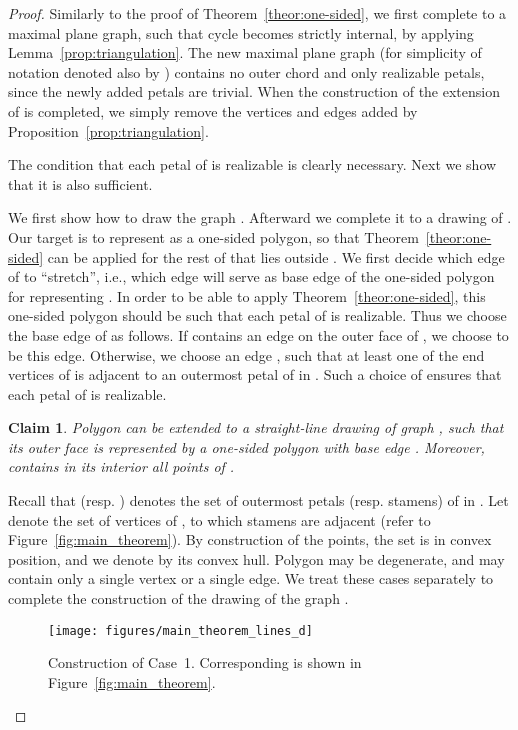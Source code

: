 \documentclass{llncs}
\newtheorem{stat}{Claim}
\begin{document}
\begin{proof}
Similarly to the proof of Theorem~\ref{theor:one-sided}, we first complete  to a maximal plane graph, such that cycle  becomes strictly internal, by applying Lemma~\ref{prop:triangulation}. The new maximal plane graph (for simplicity of notation denoted also by ) contains no outer chord and only realizable petals, since the newly added petals are trivial. When the construction of the extension of  is completed, we simply remove the vertices and edges added by Proposition~\ref{prop:triangulation}. 

The condition that each petal of  is realizable is clearly necessary. Next we show that it is also sufficient.

We first show how to draw the graph . Afterward we complete it to a drawing of . Our target is to represent  as a one-sided polygon, so that Theorem~\ref{theor:one-sided} 
can be applied for the rest of  that lies outside .
We first decide which edge of  to ``stretch'', i.e., which edge will serve as base edge of the one-sided polygon for representing . 
In order to be able to apply Theorem~\ref{theor:one-sided}, this one-sided polygon should be such that each petal of   is realizable. 
Thus we choose the base edge  of   as follows. If   contains an edge on the outer face of , we choose  to be this edge. 
Otherwise, we choose an edge , such that at least one of the end vertices of  is adjacent to an outermost petal of  in . Such a choice of  ensures that each petal of  is realizable. 


\begin{stat}
Polygon  can be extended to a straight-line drawing of  graph , such that its outer face  is represented by a one-sided polygon with base edge . Moreover,  contains in its interior all points of .
\end{stat}

Recall that  (resp. ) denotes the set of outermost petals (resp. stamens) of  in .  Let  denote the set of vertices of , to which stamens  are adjacent (refer to Figure~\ref{fig:main_theorem}). By construction of the  points, the set  is in convex position, and we denote by  its convex hull. Polygon  may be degenerate, and may contain only a single vertex or a single edge. We treat these cases separately to complete the construction of the drawing of the graph .  

\begin{figure}[tb]
 \centering
 {\texttt{[image: figures/main\_theorem\_lines\_d]}}
 \caption{Construction of Case~1. Corresponding  is shown in Figure~\ref{fig:main_theorem}.}
 \label{fig:main_theorem_lines_d}
\end{figure}


\end{proof}
\end{document}
